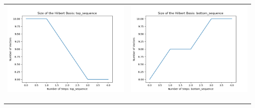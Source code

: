 \documentclass[10pt]{article}
\begin{document}
\begin{tabular}{c|c}
\begin{minipage}{.45\textwidth}
\includegraphics[width=\textwidth]{"DATA/4d/5 generators 2 bound B/top_sequence SIZE"}
\end{minipage} &
\begin{minipage}{.45\textwidth}
\includegraphics[width=\textwidth]{"DATA/4d/5 generators 2 bound B bottomup/bottom_sequence SIZE"}
\end{minipage} \\ \\
\hline \\\begin{minipage}{.45\textwidth}

\end{minipage}
\end{tabular}
\end{document}
